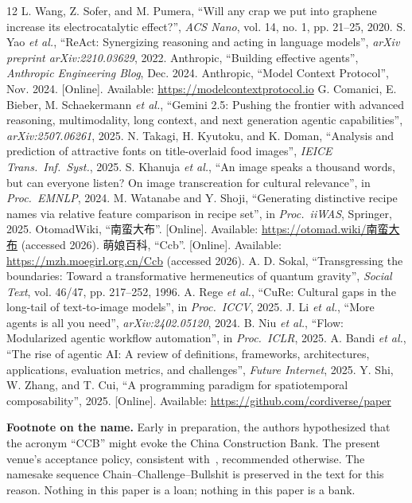 \documentclass[conference,10pt]{IEEEtran}
\begin{document}
\begin{thebibliography}{12}
 L. Wang, Z. Sofer, and M. Pumera, ``Will any crap
we put into graphene increase its electrocatalytic effect?'', \emph{ACS
Nano}, vol. 14, no. 1, pp. 21--25, 2020.
 S. Yao \emph{et al.}, ``ReAct: Synergizing
reasoning and acting in language models'', \emph{arXiv preprint
arXiv:2210.03629}, 2022.
 Anthropic, ``Building effective agents'',
\emph{Anthropic Engineering Blog}, Dec. 2024.
 Anthropic, ``Model Context Protocol'', Nov. 2024.
[Online]. Available: \url{https://modelcontextprotocol.io}
 G. Comanici, E. Bieber, M. Schaekermann
\emph{et al.}, ``Gemini 2.5: Pushing the frontier with advanced
reasoning, multimodality, long context, and next generation agentic
capabilities'', \emph{arXiv:2507.06261}, 2025.
 N. Takagi, H. Kyutoku, and K. Doman, ``Analysis
and prediction of attractive fonts on title-overlaid food images'',
\emph{IEICE Trans.\ Inf.\ Syst.}, 2025.
 S. Khanuja \emph{et al.}, ``An image speaks a
thousand words, but can everyone listen? On image transcreation for
cultural relevance'', in \emph{Proc.\ EMNLP}, 2024.
 M. Watanabe and Y. Shoji, ``Generating
distinctive recipe names via relative feature comparison in recipe
set'', in \emph{Proc.\ iiWAS}, Springer, 2025.
 OtomadWiki, ``南蛮大布''. [Online]. Available:
\url{https://otomad.wiki/南蛮大布} (accessed 2026).
 萌娘百科, ``Ccb''. [Online]. Available:
\url{https://mzh.moegirl.org.cn/Ccb} (accessed 2026).
 A. D. Sokal, ``Transgressing the boundaries:
Toward a transformative hermeneutics of quantum gravity'', \emph{Social
Text}, vol. 46/47, pp. 217--252, 1996.
 A. Rege \emph{et al.}, ``CuRe: Cultural gaps in the
long-tail of text-to-image models'', in \emph{Proc.\ ICCV}, 2025.
 J. Li \emph{et al.}, ``More agents is all you
need'', \emph{arXiv:2402.05120}, 2024.
 B. Niu \emph{et al.}, ``Flow: Modularized agentic
workflow automation'', in \emph{Proc.\ ICLR}, 2025.
 A. Bandi \emph{et al.}, ``The rise of agentic
AI: A review of definitions, frameworks, architectures, applications,
evaluation metrics, and challenges'', \emph{Future Internet}, 2025.
 Y. Shi, W. Zhang, and T. Cui, ``A programming
paradigm for spatiotemporal composability'', 2025. [Online]. Available:
\url{https://github.com/cordiverse/paper}
\end{thebibliography}

\vspace{4pt}
\footnotesize
\textbf{Footnote on the name.} Early in preparation, the authors
hypothesized that the acronym ``CCB'' might evoke the China
Construction Bank. The present venue's acceptance policy, consistent
with~\cite{pumera2020,sokal1996}, recommended otherwise. The namesake
sequence Chain--Challenge--Bullshit is preserved in the text for this
reason. Nothing in this paper is a loan; nothing in this paper is a
bank.
\end{document}

